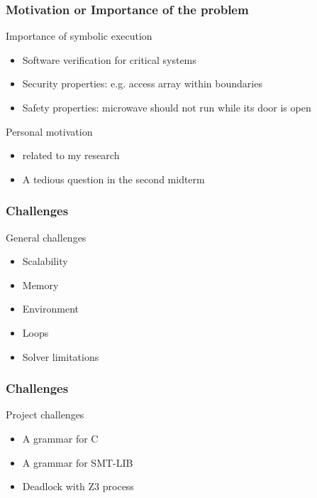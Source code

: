 \documentclass{beamer}
\begin{document}
\begin{frame}[fragile]
\frametitle{Motivation or Importance of the problem}
\begin{block}{Importance of symbolic execution}
\begin{itemize}
\item Software verification for critical systems
\item Security properties: e.g. access array within boundaries
\item Safety properties: microwave should not run while its door is open
\end{itemize}
\end{block}

\begin{block}{Personal motivation}
\begin{itemize}
\item related to my research 
\item A tedious question in the second midterm
\end{itemize}
\end{block}

\end{frame}

\begin{frame}[fragile]
\frametitle{Challenges}
\begin{block}{General challenges}
\begin{itemize}
\item Scalability
\item Memory
\item Environment
\item Loops
\item Solver limitations
\end{itemize}
\end{block}
\end{frame}

\begin{frame}[fragile]
\frametitle{Challenges}
\begin{block}{Project challenges}
\begin{itemize}
\item A grammar for C
\item A grammar for SMT-LIB
\item Deadlock with Z3 process

\end{itemize}
\end{block}
\end{frame}
\end{document}
